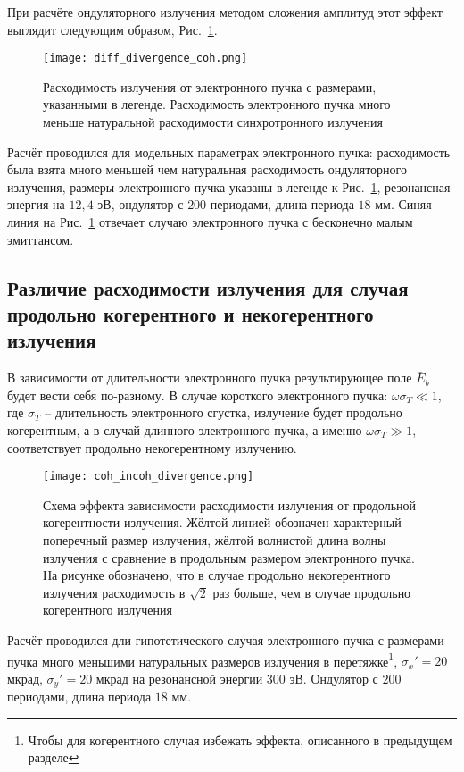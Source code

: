 При расчёте ондуляторного излучения методом сложения амплитуд этот эффект выглядит следующим образом, Рис.~\ref{fig:diff_coh_incoh_rad}.
\begin{figure}[H] 
	\centering 	\texttt{[image: diff\_divergence\_coh.png]}
	\caption{Расходимость излучения от электронного пучка с размерами, указанными в легенде. Расходимость электронного пучка много меньше натуральной расходимости синхротронного излучения}
	\label{fig:diff_coh_incoh_rad}
\end{figure}
Расчёт проводился для модельных параметрах электронного пучка: расходимость была взята много меньшей чем натуральная расходимость ондуляторного излучения, размеры электронного пучка указаны в легенде к Рис.~\ref{fig:diff_coh_incoh_rad}, резонансная энергия на $12,4$ эВ, ондулятор с $200$ периодами, длина периода $18$ мм. Синяя линия на Рис.~\ref{fig:diff_coh_incoh_rad} отвечает случаю электронного пучка с бесконечно малым эмиттансом.

\subsection{Различие расходимости излучения для случая продольно когерентного и некогерентного излучения}
В зависимости от длительности электронного пучка результирующее поле $\bar{E}_{b}$ будет вести себя по-разному. В случае короткого электронного пучка: $\omega \sigma_T \ll 1$, где $\sigma_T$ -- длительность электронного сгустка, излучение будет продольно когерентным, а в случай длинного электронного пучка, а именно  $\omega \sigma_T \gg 1$, соответствует продольно некогерентному излучению. 

\begin{figure}[H] 
	\centering 	\texttt{[image: coh\_incoh\_divergence.png]}
	\caption{Схема эффекта зависимости расходимости излучения от продольной когерентности излучения. Жёлтой линией обозначен характерный поперечный размер излучения, жёлтой волнистой длина волны излучения с сравнение в продольным размером электронного пучка. На рисунке обозначено, что в случае продольно некогерентного излучения расходимость в $\sqrt{2}$ раз больше, чем в случае продольно когерентного излучения}
	\label{fig:coh_incoh_divergence}
\end{figure}
Расчёт проводился дли гипотетического случая электронного пучка с размерами пучка много меньшими натуральных размеров излучения в перетяжке\footnote{Чтобы для когерентного случая избежать эффекта, описанного в предыдущем разделе}, $\sigma_x' = 20$ мкрад, $\sigma_y' = 20$ мкрад на резонансной энергии $300$ эВ. Ондулятор с $200$ периодами, длина периода $18$ мм. 


